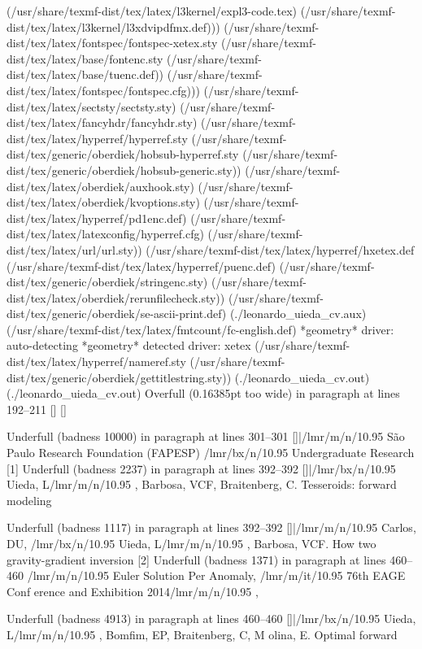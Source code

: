 \documentclass[11pt, a4paper]{article}
\begin{document}
(/usr/share/texmf-dist/tex/latex/l3kernel/expl3-code.tex)
(/usr/share/texmf-dist/tex/latex/l3kernel/l3xdvipdfmx.def)))
(/usr/share/texmf-dist/tex/latex/fontspec/fontspec-xetex.sty
(/usr/share/texmf-dist/tex/latex/base/fontenc.sty
(/usr/share/texmf-dist/tex/latex/base/tuenc.def))
(/usr/share/texmf-dist/tex/latex/fontspec/fontspec.cfg)))
(/usr/share/texmf-dist/tex/latex/sectsty/sectsty.sty)
(/usr/share/texmf-dist/tex/latex/fancyhdr/fancyhdr.sty)
(/usr/share/texmf-dist/tex/latex/hyperref/hyperref.sty
(/usr/share/texmf-dist/tex/generic/oberdiek/hobsub-hyperref.sty
(/usr/share/texmf-dist/tex/generic/oberdiek/hobsub-generic.sty))
(/usr/share/texmf-dist/tex/latex/oberdiek/auxhook.sty)
(/usr/share/texmf-dist/tex/latex/oberdiek/kvoptions.sty)
(/usr/share/texmf-dist/tex/latex/hyperref/pd1enc.def)
(/usr/share/texmf-dist/tex/latex/latexconfig/hyperref.cfg)
(/usr/share/texmf-dist/tex/latex/url/url.sty))
(/usr/share/texmf-dist/tex/latex/hyperref/hxetex.def
(/usr/share/texmf-dist/tex/latex/hyperref/puenc.def)
(/usr/share/texmf-dist/tex/generic/oberdiek/stringenc.sty)
(/usr/share/texmf-dist/tex/latex/oberdiek/rerunfilecheck.sty))
(/usr/share/texmf-dist/tex/generic/oberdiek/se-ascii-print.def)
(./leonardo_uieda_cv.aux)
(/usr/share/texmf-dist/tex/latex/fmtcount/fc-english.def)
*geometry* driver: auto-detecting
*geometry* detected driver: xetex
(/usr/share/texmf-dist/tex/latex/hyperref/nameref.sty
(/usr/share/texmf-dist/tex/generic/oberdiek/gettitlestring.sty))
(./leonardo_uieda_cv.out) (./leonardo_uieda_cv.out)
Overfull \hbox (0.16385pt too wide) in paragraph at lines 192--211
[] [] 

Underfull \hbox (badness 10000) in paragraph at lines 301--301
[]|\TU/lmr/m/n/10.95 São Paulo Research Foundation (FAPESP) \TU/lmr/bx/n/10.95 
Undergraduate Research
[1]
Underfull \hbox (badness 2237) in paragraph at lines 392--392
[]|\TU/lmr/bx/n/10.95 Uieda, L\TU/lmr/m/n/10.95 , Barbosa, VCF, Braitenberg, C.
 Tesseroids: forward modeling

Underfull \hbox (badness 1117) in paragraph at lines 392--392
[]|\TU/lmr/m/n/10.95 Carlos, DU, \TU/lmr/bx/n/10.95 Uieda, L\TU/lmr/m/n/10.95 ,
 Barbosa, VCF. How two gravity-gradient inversion
[2]
Underfull \hbox (badness 1371) in paragraph at lines 460--460
\TU/lmr/m/n/10.95 Euler Solution Per Anomaly, \TU/lmr/m/it/10.95 76th EAGE Conf
erence and Exhibition 2014\TU/lmr/m/n/10.95 ,

Underfull \hbox (badness 4913) in paragraph at lines 460--460
[]|\TU/lmr/bx/n/10.95 Uieda, L\TU/lmr/m/n/10.95 , Bomfim, EP, Braitenberg, C, M
olina, E. Optimal forward
\end{document}
